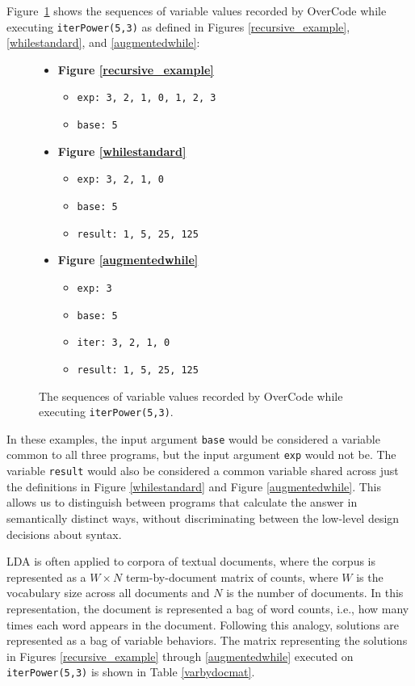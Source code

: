 Figure~\ref{fig:seqvarvals} shows the sequences of variable values recorded by OverCode while executing \texttt{iterPower(5,3)} as defined in Figures \ref{recursive_example}, \ref{whilestandard}, and \ref{augmentedwhile}:
\begin{figure}
\begin{itemize}
  \item {\bf Figure \ref{recursive_example}}
  \begin{itemize}
  \setlength\itemsep{0.05em}
  \item \texttt{exp: 3, 2, 1, 0, 1, 2, 3}
  \item \texttt{base: 5}
  \end{itemize}
  \item {\bf Figure \ref{whilestandard}}
  \begin{itemize}
  \item \texttt{exp: 3, 2, 1, 0}
  \item \texttt{base: 5}
  \item \texttt{result: 1, 5, 25, 125}
  \end{itemize}
  \item {\bf Figure \ref{augmentedwhile}}
  \begin{itemize}
  \item \texttt{exp: 3}
  \item \texttt{base: 5}
  \item \texttt{iter: 3, 2, 1, 0}
  \item \texttt{result: 1, 5, 25, 125}
  \end{itemize}
\end{itemize}
\caption{The sequences of variable values recorded by OverCode while executing \texttt{iterPower(5,3)}.}
\label{fig:seqvarvals}
\end{figure}

In these examples, the input argument \texttt{base} would be considered a variable common to all three programs, but the input argument \texttt{exp} would not be. The variable \texttt{result} would also be considered a common variable shared across just the definitions in Figure \ref{whilestandard} and Figure \ref{augmentedwhile}. This allows us to distinguish between programs that calculate the answer in semantically distinct ways, without discriminating between the low-level design decisions about syntax. 

LDA is often applied to corpora of textual documents, where the corpus is represented as a $W \times N$ term-by-document matrix of counts, where $W$ is the vocabulary size across all documents and $N$ is the number of documents. In this representation, the document is represented a bag of word counts, i.e., how many times each word appears in the document. Following this analogy, solutions are represented as a bag of variable behaviors. The matrix representing the solutions in Figures \ref{recursive_example} through \ref{augmentedwhile} executed on \texttt{iterPower(5,3)} is shown in Table \ref{varbydocmat}.

